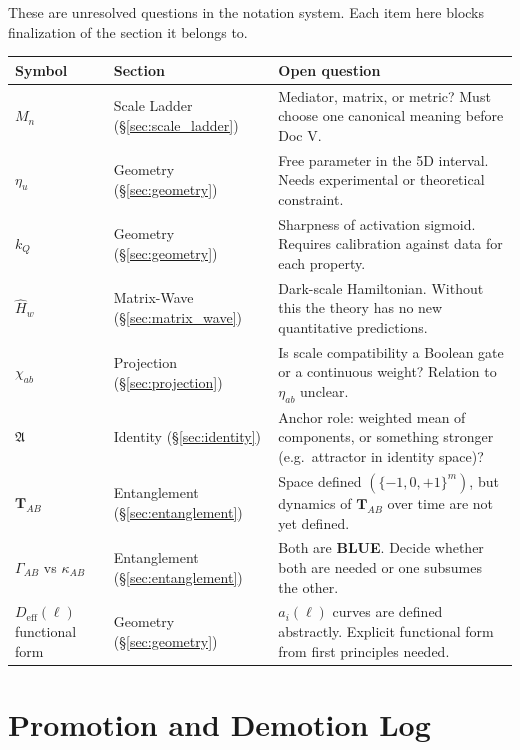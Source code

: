 \documentclass[11pt, a4paper, oneside]{article}
\newcommand{\BLU}{\colorbox{BlueBG}{\textcolor{BlueFG}{\small\bfseries BLUE}}}
\begin{document}
\noindent
These are unresolved questions in the notation system.
Each item here blocks finalization of the section it belongs to.

\begin{longtable}{L{2.2cm} L{4.0cm} L{7.0cm}}
  \toprule
  \textbf{Symbol} & \textbf{Section} & \textbf{Open question} \\
  \midrule
  \endhead
  $M_n$ & Scale Ladder (\S\ref{sec:scale_ladder}) &
    Mediator, matrix, or metric?
    Must choose one canonical meaning before Doc V. \\[4pt]
  $\eta_u$ & Geometry (\S\ref{sec:geometry}) &
    Free parameter in the 5D interval.
    Needs experimental or theoretical constraint. \\[4pt]
  $k_Q$ & Geometry (\S\ref{sec:geometry}) &
    Sharpness of activation sigmoid.
    Requires calibration against data for each property. \\[4pt]
  $\hat{H}_w$ & Matrix-Wave (\S\ref{sec:matrix_wave}) &
    Dark-scale Hamiltonian.
    Without this the theory has no new quantitative predictions. \\[4pt]
  $\chi_{ab}$ & Projection (\S\ref{sec:projection}) &
    Is scale compatibility a Boolean gate or a continuous weight?
    Relation to $\eta_{ab}$ unclear. \\[4pt]
  $\mathfrak{A}$ & Identity (\S\ref{sec:identity}) &
    Anchor role: weighted mean of components,
    or something stronger (e.g.\ attractor in identity space)? \\[4pt]
  $\mathbf{T}_{AB}$ & Entanglement (\S\ref{sec:entanglement}) &
    Space defined $(\{-1,0,+1\}^m)$, but dynamics of
    $\mathbf{T}_{AB}$ over time are not yet defined. \\[4pt]
  $\Gamma_{AB}$ vs $\kappa_{AB}$ & Entanglement (\S\ref{sec:entanglement}) &
    Both are \BLU. Decide whether both are needed or
    one subsumes the other. \\[4pt]
  $D_{\mathrm{eff}}(\ell)$ functional form & Geometry (\S\ref{sec:geometry}) &
    $a_i(\ell)$ curves are defined abstractly.
    Explicit functional form from first principles needed. \\
  \bottomrule
\end{longtable}

\section{Promotion and Demotion Log}
\label{sec:log}
\end{document}
